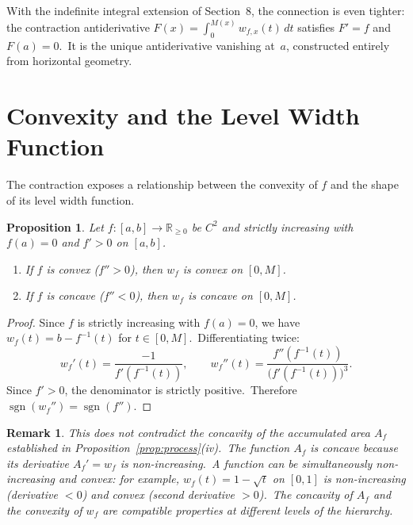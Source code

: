 \documentclass[11pt,a4paper]{article}
\newtheorem{proposition}[theorem]{Proposition}
\newtheorem{remark}[theorem]{Remark}
\begin{document}
With the indefinite integral extension of Section~8, the connection is even tighter: the contraction antiderivative $F(x)=\int_0^{M(x)}w_{f,x}(t)\,dt$ satisfies $F'=f$ and $F(a)=0$.\ It is the unique antiderivative vanishing at~$a$, constructed entirely from horizontal geometry.

\section{Convexity and the Level Width Function}\label{sec:convexity}

The contraction exposes a relationship between the convexity of $f$ and the shape of its level width function.

\begin{proposition}\label{prop:convexity}
Let $f:[a,b]\to\mathbb{R}_{\geq 0}$ be $C^2$ and strictly increasing with $f(a)=0$ and $f'>0$ on $[a,b]$.
\begin{enumerate}[label=(\roman*)]
\item If $f$ is convex ($f''>0$), then $w_f$ is convex on $[0,M]$.
\item If $f$ is concave ($f''<0$), then $w_f$ is concave on $[0,M]$.
\end{enumerate}
\end{proposition}

\begin{proof}
Since $f$ is strictly increasing with $f(a)=0$, we have $w_f(t)=b-f^{-1}(t)$ for $t\in[0,M]$.\ Differentiating twice:
\[
w_f'(t) = \frac{-1}{f'(f^{-1}(t))}, \qquad
w_f''(t) = \frac{f''(f^{-1}(t))}{\bigl(f'(f^{-1}(t))\bigr)^3}.
\]
Since $f'>0$, the denominator is strictly positive.\ Therefore $\operatorname{sgn}(w_f'') = \operatorname{sgn}(f'')$.
\end{proof}

\begin{remark}\label{rem:no-contradict}
This does not contradict the concavity of the accumulated area $A_f$ established in Proposition~\ref{prop:process}(iv).\ The function $A_f$ is concave because its derivative $A_f'=w_f$ is non-increasing.\ A function can be simultaneously non-increasing and convex: for example, $w_f(t)=1-\sqrt{t}$ on $[0,1]$ is non-increasing (derivative $<0$) and convex (second derivative $>0$).\ The concavity of $A_f$ and the convexity of $w_f$ are compatible properties at different levels of the hierarchy.
\end{remark}
\end{document}
